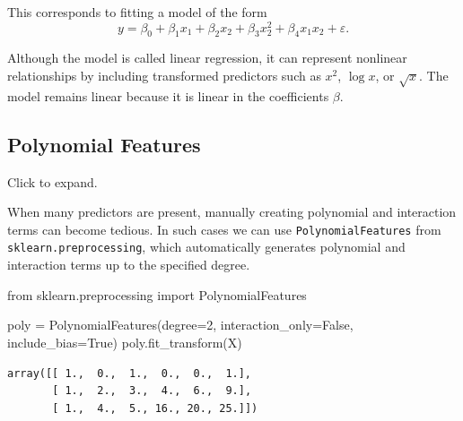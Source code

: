 \documentclass[
  letterpaper,
  DIV=11,
  numbers=noendperiod]{scrreprt}
\newenvironment{Shaded}{\begin{snugshade}}{\end{snugshade}}
\newcommand{\DecValTok}[1]{\textcolor[rgb]{0.68,0.00,0.00}{#1}}
\newcommand{\ImportTok}[1]{\textcolor[rgb]{0.00,0.46,0.62}{#1}}
\newcommand{\NormalTok}[1]{\textcolor[rgb]{0.00,0.23,0.31}{#1}}
\newcommand{\OperatorTok}[1]{\textcolor[rgb]{0.37,0.37,0.37}{#1}}
\newcommand{\VariableTok}[1]{\textcolor[rgb]{0.07,0.07,0.07}{#1}}
\theoremstyle{definition}
\theoremstyle{definition}
\theoremstyle{plain}
\theoremstyle{plain}
\theoremstyle{remark}
\begin{document}
This corresponds to fitting a model of the form \[
y=\beta_0+\beta_1x_1+\beta_2x_2+\beta_3x_2^2+\beta_4x_1x_2+\varepsilon.
\]

\begin{tcolorbox}[enhanced jigsaw, arc=.35mm, bottomrule=.15mm, bottomtitle=1mm, breakable, colback=white, colbacktitle=quarto-callout-tip-color!10!white, colframe=quarto-callout-tip-color-frame, coltitle=black, left=2mm, leftrule=.75mm, opacityback=0, opacitybacktitle=0.6, rightrule=.15mm, title=\textcolor{quarto-callout-tip-color}{\faLightbulb}\hspace{0.5em}{Tip}, titlerule=0mm, toprule=.15mm, toptitle=1mm]

Although the model is called linear regression, it can represent
nonlinear relationships by including transformed predictors such as
\(x^2\), \(\log x\), or \(\sqrt{x}\). The model remains linear because
it is linear in the coefficients \(\beta\).

\end{tcolorbox}

\subsection{Polynomial Features}\label{polynomial-features}

Click to expand.

When many predictors are present, manually creating polynomial and
interaction terms can become tedious. In such cases we can use
\texttt{PolynomialFeatures} from \texttt{sklearn.preprocessing}, which
automatically generates polynomial and interaction terms up to the
specified degree.

\begin{Shaded}
\begin{Highlighting}[]
\ImportTok{from}\NormalTok{ sklearn.preprocessing }\ImportTok{import}\NormalTok{ PolynomialFeatures}

\NormalTok{poly }\OperatorTok{=}\NormalTok{ PolynomialFeatures(degree}\OperatorTok{=}\DecValTok{2}\NormalTok{, interaction\_only}\OperatorTok{=}\VariableTok{False}\NormalTok{, include\_bias}\OperatorTok{=}\VariableTok{True}\NormalTok{)}
\NormalTok{poly.fit\_transform(X)}
\end{Highlighting}
\end{Shaded}

\begin{verbatim}
array([[ 1.,  0.,  1.,  0.,  0.,  1.],
       [ 1.,  2.,  3.,  4.,  6.,  9.],
       [ 1.,  4.,  5., 16., 20., 25.]])
\end{verbatim}
\end{document}
